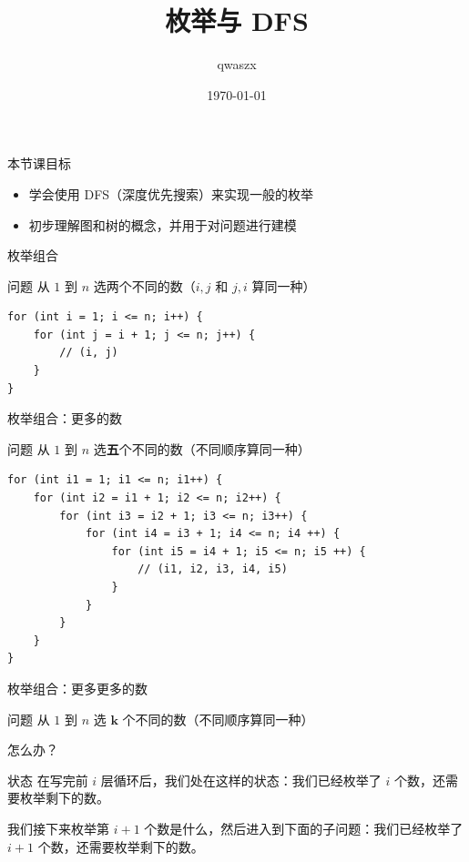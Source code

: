 \documentclass[11pt,aspectratio=169]{beamer}
\title{枚举与 DFS}
\author{qwaszx}
\date{\today}
\begin{document}
\begin{frame}
  \titlepage
\end{frame}

\begin{frame}{本节课目标}
\begin{itemize}
    \item 学会使用 DFS（深度优先搜索）来实现一般的枚举
    \item 初步理解图和树的概念，并用于对问题进行建模
\end{itemize}
\end{frame}

\begin{frame}[fragile]{枚举组合}
    \begin{block}{问题}
        从 $1$ 到 $n$ 选两个不同的数（$i,j$ 和 $j,i$ 算同一种）
    \end{block}
    
    \pause
\begin{lstlisting}
for (int i = 1; i <= n; i++) {
    for (int j = i + 1; j <= n; j++) {
        // (i, j)
    }
}
\end{lstlisting}
\end{frame}

\begin{frame}[fragile]{枚举组合：更多的数}
    \begin{block}{问题}
        从 $1$ 到 $n$ 选\textbf{五}个不同的数（不同顺序算同一种）
    \end{block}
    
    \pause
\begin{lstlisting}
for (int i1 = 1; i1 <= n; i1++) {
    for (int i2 = i1 + 1; i2 <= n; i2++) {
        for (int i3 = i2 + 1; i3 <= n; i3++) {
            for (int i4 = i3 + 1; i4 <= n; i4 ++) {
                for (int i5 = i4 + 1; i5 <= n; i5 ++) {
                    // (i1, i2, i3, i4, i5)
                }
            }
        }
    }
}
\end{lstlisting}
\end{frame}

\begin{frame}[fragile]{枚举组合：更多更多的数}
    \begin{block}{问题}
        从 $1$ 到 $n$ 选 $\mathbf{k}$ 个不同的数（不同顺序算同一种）
    \end{block}
    
    \pause
    怎么办？
\end{frame}

\begin{frame}[fragile]{状态}
    在写完前 $i$ 层循环后，我们处在这样的状态：我们已经枚举了 $i$ 个数，还需要枚举剩下的数。

    我们接下来枚举第 $i+1$ 个数是什么，然后进入到下面的子问题：我们已经枚举了 $i+1$ 个数，还需要枚举剩下的数。
\end{frame}
\end{document}
